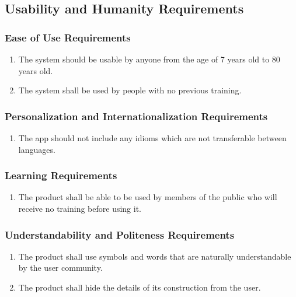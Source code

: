 \documentclass[]{article}
\begin{document}
\begin{enumerate}[{VP}1.]

\subsection{Usability and Humanity Requirements}
\label{sub:usability_and_humanity_requirements}

\subsubsection{Ease of Use Requirements}
\label{ssub:ease_of_use_requirements}
\begin{enumerate}[{UH}1. ]
	\item The system should be usable by anyone from the age of 7 years old to 80 years old.
	\item The system shall be used by people with no previous training.
\end{enumerate}

\subsubsection{Personalization and Internationalization Requirements}
\label{ssub:personalization_and_internationalization_requirements}
\begin{enumerate}[{UH}1. ]
	\item The app should not include any idioms which are not transferable between languages.
\end{enumerate}

\subsubsection{Learning Requirements}
\label{ssub:learning_requirements}
\begin{enumerate}[{UH}1. ]
	\item The product shall be able to be used by members of the public who will receive no training before using it.
\end{enumerate}

\subsubsection{Understandability and Politeness Requirements}
\label{ssub:understandability_and_politeness_requirements}
\begin{enumerate}[{UH}1. ]
	\item The product shall use symbols and words that are naturally understandable by the user community.
    \item The product shall hide the details of its construction from the user.
\end{enumerate}


\end{enumerate}
\end{document}
